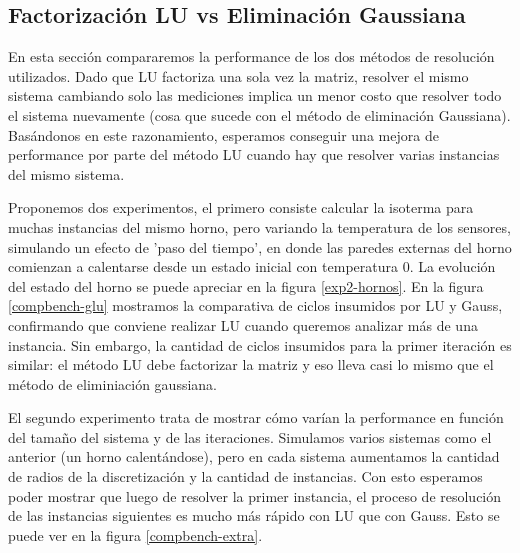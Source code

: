 \newpage
\subsection{Factorización LU vs Eliminación Gaussiana}

En esta sección compararemos la performance de los dos métodos de resolución utilizados. Dado que LU factoriza una sola vez la matriz, resolver el mismo sistema cambiando solo las mediciones implica un menor costo que resolver todo el sistema nuevamente (cosa que sucede con el método de eliminación Gaussiana). Basándonos en este razonamiento, esperamos conseguir una mejora de performance por parte del método LU cuando hay que resolver varias instancias del mismo sistema.


Proponemos dos experimentos, el primero consiste calcular la isoterma para muchas instancias del mismo horno, pero variando la temperatura de los sensores, simulando un efecto de 'paso del tiempo', en donde las paredes externas del horno comienzan a calentarse desde un estado inicial con temperatura $0$. La evolución del estado del horno se puede apreciar en la figura \ref{exp2-hornos}. En la figura \ref{compbench-glu} mostramos la comparativa de ciclos insumidos por LU y Gauss, confirmando que conviene realizar LU cuando queremos analizar más de una instancia. Sin embargo, la cantidad de ciclos insumidos para la primer iteración es similar: el método LU debe factorizar la matriz y eso lleva casi lo mismo que el método de eliminiación gaussiana. 


El segundo experimento trata de mostrar cómo varían la performance en función del tamaño del sistema y de las iteraciones. Simulamos varios sistemas como el anterior (un horno calentándose), pero en cada sistema aumentamos la cantidad de radios de la discretización y la cantidad de instancias. Con esto esperamos poder mostrar que luego de resolver la primer instancia, el proceso de resolución de las instancias siguientes es mucho más rápido con LU que con Gauss. Esto se puede ver en la figura \ref{compbench-extra}.

~

